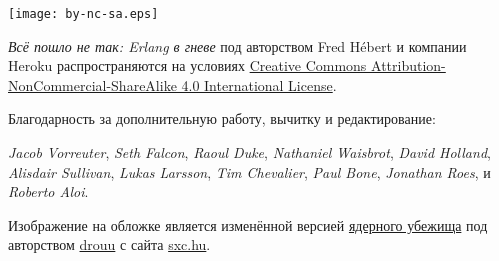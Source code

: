 \documentclass[11pt, oneside]{book}   	%
\newcommand{\LongTitle}{Всё пошло не так: Erlang в гневе}
\begin{document}



\clearpage
\thispagestyle{fancy}

\fancyhf{} %
\renewcommand{\headrulewidth}{0pt} %
\renewcommand{\footrulewidth}{0pt}

\vspace*{\fill}


\begin{center}
\texttt{[image: by-nc-sa.eps]}
\end{center}

\begin{center}
\emph{\LongTitle} под авторством Fred Hébert и компании Heroku распространяются 
на условиях \href{http://creativecommons.org/licenses/by-nc-sa/4.0/}{Creative 
	Commons Attribution-NonCommercial-ShareAlike 4.0 International License}.
\end{center}

Благодарность за дополнительную работу, вычитку и редактирование:

\emph{Jacob Vorreuter}, \emph{Seth Falcon}, \emph{Raoul Duke}, \emph{Nathaniel Waisbrot}, \emph{David Holland}, \emph{Alisdair Sullivan}, \emph{Lukas Larsson}, \emph{Tim Chevalier}, \emph{Paul Bone}, \emph{Jonathan Roes}, и \emph{Roberto Aloi}.

\null
\vfill
Изображение на обложке является изменённой версией
	\href{http://www.freeimages.com/photo/533163}{ядерного убежища} под авторством
	\href{http://www.freeimages.com/profile/drouu}{drouu} с сайта
	\href{http://sxc.hu}{sxc.hu}.


\end{document}
